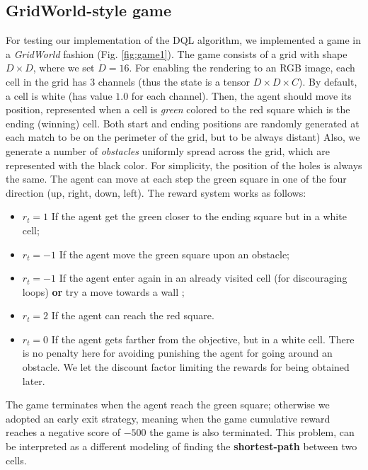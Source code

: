 \documentclass{article}
\begin{document}
\subsection{GridWorld-style game}
For testing our implementation of the DQL algorithm, we implemented a game in a \textit{GridWorld} fashion (Fig. \ref{fig:game1}). The game consists of a grid with shape $D \times D$, where we set $D = 16$. For enabling the rendering to an RGB image, each cell in the grid has $3$ channels (thus the state is a tensor $D \times D \times C$). By default, a cell is white (has value $1.0$ for each channel). Then, the agent should move its position, represented when a cell is \textit{green} colored to the red square which is the ending (winning) cell. Both start and ending positions are randomly generated at each match to be on the perimeter of the grid, but to be always distant)  Also, we generate a number of \textit{obstacles} uniformly spread across the grid, which are represented with the black color. For simplicity, the position of the holes is always the same. The agent can move at each step the green square in one of the four direction (up, right, down, left).
The reward system works as follows:
\begin{itemize}
	\item $r_t = 1$ If the agent get the green closer to the ending square but in a white cell;
	\item $r_t = -1$ If the agent move the green square upon an obstacle;
	\item $r_t = -1$ If the agent enter again in an already visited cell (for discouraging loops) \textbf{or} try a move towards a wall ;
	\item $r_t = 2$ If the agent can reach the red square.
	\item $r_t = 0$ If the agent gets farther from the objective, but in a white cell. There is no penalty here for avoiding punishing the agent for going around an obstacle. We let the discount factor limiting the rewards for being obtained later.
\end{itemize}
The game terminates when the agent reach the green square; otherwise we adopted an early exit strategy, meaning when the game cumulative reward reaches a negative score of $-500$ the game is also terminated. 
This problem, can be interpreted as a different modeling of finding the \textbf{shortest-path} between two cells.
\end{document}
